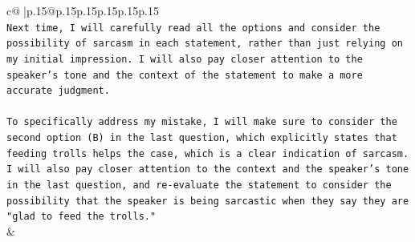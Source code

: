 \documentclass{article}
\begin{document}
{\begin{supertabular}{c@{$\;$}|p{.15\linewidth}@{}p{.15\linewidth}p{.15\linewidth}p{.15\linewidth}p{.15\linewidth}p{.15\linewidth}}
{{{\\ 
\texttt{Next time, I will carefully read all the options and consider the possibility of sarcasm in each statement, rather than just relying on my initial impression. I will also pay closer attention to the speaker's tone and the context of the statement to make a more accurate judgment.} \\
\\ 
\texttt{To specifically address my mistake, I will make sure to consider the second option (B) in the last question, which explicitly states that feeding trolls helps the case, which is a clear indication of sarcasm. I will also pay closer attention to the context and the speaker's tone in the last question, and re{-}evaluate the statement to consider the possibility that the speaker is being sarcastic when they say they are "glad to feed the trolls."} \\
            }
        }
    }
    & \\ \\

\end{supertabular}
}
\end{document}
